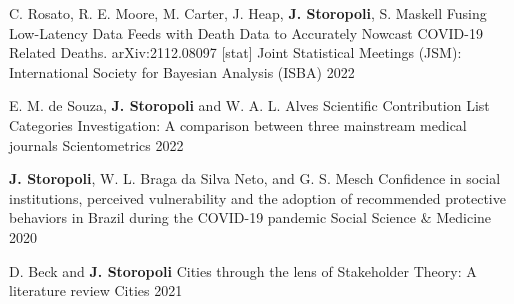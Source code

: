 

\begin{cventries}

  \cventry
    {C. Rosato, R. E. Moore, M. Carter, J. Heap, \textbf{J. Storopoli}, S. Maskell} %
    {Fusing Low-Latency Data Feeds with Death Data to Accurately Nowcast COVID-19 Related Deaths. arXiv:2112.08097 [stat]} %
    {Joint Statistical Meetings (JSM): International Society for Bayesian Analysis (ISBA)} %
    {2022} %

  \cventry
    {E. M. de Souza, \textbf{J. Storopoli} and W. A. L. Alves} %
    {Scientific Contribution List Categories Investigation: A comparison between three mainstream medical journals} %
    {Scientometrics} %
    {2022} %

  \cventry
    {\textbf{J. Storopoli}, W. L. Braga da Silva Neto, and G. S. Mesch} %
    {Confidence in social institutions, perceived vulnerability and the adoption of recommended protective behaviors in Brazil during the COVID-19 pandemic} %
    {Social Science \& Medicine} %
    {2020} %

  \cventry
    {D. Beck and \textbf{J. Storopoli}} %
    {Cities through the lens of Stakeholder Theory: A literature review} %
    {Cities} %
    {2021} %

\end{cventries}

